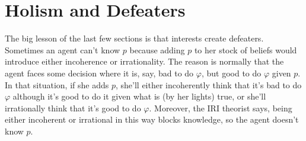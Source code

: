 \documentclass[oneside]{book}
\begin{document}
%
%
%
%

\section{Holism and Defeaters} \label{sect:holism}
The big lesson of the last few sections is that interests create defeaters. Sometimes an agent can't know $p$ because adding $p$ to her stock of beliefs would introduce either incoherence or irrationality. The reason is normally that the agent faces some decision where it is, say, bad to do $\varphi$, but good to do $\varphi$ given $p$. In that situation, if she adds $p$, she'll either incoherently think that it's bad to do $\varphi$ although it's good to do it given what is (by her lights) true, or she'll irrationally think that it's good to do $\varphi$. Moreover, the IRI theorist says, being either incoherent or irrational in this way blocks knowledge, so the agent doesn't know $p$.
\end{document}
